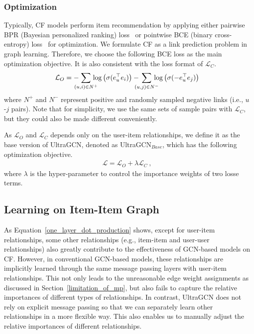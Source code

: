 \documentclass[sigconf,authorversion]{acmart}
\begin{document}
\subsubsection{Optimization}
Typically, CF models perform item recommendation by applying either pairwise BPR (Bayesian personalized ranking) loss~\cite{BPR} or pointwise BCE (binary cross-entropy) loss~\cite{NeuMF} for optimization. We formulate CF as a link prediction problem in graph learning. Therefore, we choose the following BCE loss as the main optimization objective. It is also consistent with the loss format of $\mathcal{L}_C$.
\begin{eqnarray}
\mathcal{L}_{O} =  -\hspace{-2ex}\sum_{(u,i)\in N^+}\hspace{-2ex}\log \big(\sigma(e_u^{\top} e_{i})\big) - \hspace{-2ex}\sum_{(u,j)\in N^-}\hspace{-2ex} \log \big(\sigma(-e_u^{\top} e_{j}  )\big)
\end{eqnarray}
where $N^+$ and $N^-$ represent positive and randomly sampled negative links (i.e., $u$-$j$ pairs). Note that for simplicity, we use the same sets of sample pairs with $\mathcal{L}_C$, but they could also be made different conveniently. 

As $\mathcal{L}_{O}$ and $\mathcal{L}_{C}$ depends only on the user-item relationships, we define it as the base version of UltraGCN, denoted as  UltraGCN$_{Base}$, which has the following optimization objective. 
\begin{eqnarray}
\mathcal{L} = \mathcal{L}_{O} + \lambda \mathcal{L}_C \:,
\end{eqnarray}
where $\lambda$ is the hyper-parameter to control the importance weights of two losse terms. 


\subsection{Learning on Item-Item Graph}
\label{learning_on_ii}
As Equation~\ref{one_layer_dot_production} shows, 
except for user-item relationships, some other relationships (e.g., item-item and user-user relationships) also greatly contribute to the effectiveness of GCN-based models on CF. However, in conventional GCN-based models, these relationships are implicitly learned through the same message passing layers with user-item relationships. This not only leads to the unreasonable edge weight assignments as discussed in Section~\ref{limitation_of_mp}, but also fails to capture the relative importances of different types of relationships. In contrast, UltraGCN does not rely on explicit message passing so that we can separately learn other relationships in a more flexible way. This also enables us to manually adjust the relative importances of different relationships.
\end{document}
